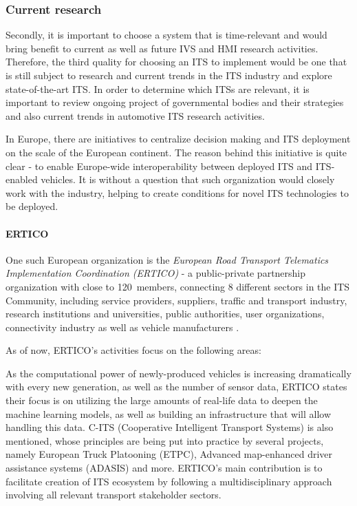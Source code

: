 \documentclass[main.tex]{subfiles}
\begin{document}
\subsubsection{Current research}\label{sec-research}

Secondly, it is important to choose a system that is time-relevant and would bring benefit to
current as well as future IVS and HMI research activities. Therefore, the third quality for choosing 
an ITS to implement would be one that is still subject to research and current trends in 
the ITS industry and explore state-of-the-art ITS. In order to determine which ITSs are relevant, 
it is important to review ongoing project of governmental bodies and their strategies and also
current trends in automotive ITS research activities.

In Europe, there are initiatives to centralize decision making and ITS deployment on the scale of 
the European continent. The reason behind this initiative is quite clear - to enable Europe-wide 
interoperability between deployed ITS and ITS-enabled vehicles. It is without a question that 
such organization would closely work with the industry, helping to create conditions for novel 
ITS technologies to be deployed.

\paragraph{ERTICO}

One such European organization is the \emph{European Road Transport Telematics
Implementation Coordination (ERTICO)} - a public-private partnership organization
with close to 120~members, connecting 8 different sectors in the ITS Community, including
service providers, suppliers, traffic and transport industry, research institutions and
universities, public authorities, user organizations, connectivity industry as well as
vehicle manufacturers \cite{ertico}.

As of now, ERTICO's activities focus on the following areas:

As the computational power of newly-produced vehicles is increasing dramatically with every 
new generation, as well as the number of sensor data, ERTICO states their focus is on utilizing 
the large amounts of real-life data to deepen the machine learning models, as well as building 
an infrastructure that will allow handling this data. C-ITS (Cooperative Intelligent Transport
Systems) is also mentioned, whose principles are being put into practice by several projects, 
namely European Truck Platooning (ETPC), Advanced map-enhanced driver assistance systems (ADASIS) and 
more. ERTICO's main contribution is to facilitate creation of ITS ecosystem by following a
multidisciplinary approach involving all relevant transport stakeholder sectors.
\end{document}
